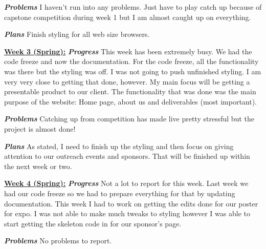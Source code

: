 \documentclass[onecolumn, draftclsnofoot, 10pt, compsoc]{IEEEtran}
\begin{document}
\textbf{\textit{{Problems}}}
\newline I haven't run into any problems. Just have to play catch up because of capstone competition during week 1 but I am almost caught up on everything. \newline 

\textbf{\textit{{Plans}}}
\newline Finish styling for all web size browsers. \newline 

\underline{\textbf{Week 3 (Spring):}}
\newline\textbf{\textit{{Progress}}}
\newline This week has been extremely busy. We had the code freeze and now the documentation. For the code freeze, all the functionality was there but the styling was off. I was not going to push unfinished styling. I am very very close to getting that done, however. My main focus will be getting a presentable product to our client. The functionality that was done was the main purpose of the website: Home page, about us and deliverables (most important). \newline 

\textbf{\textit{{Problems}}}
\newline Catching up from competition has made live pretty stressful but the project is almost done! \newline 

\textbf{\textit{{Plans}}}
\newline As stated, I need to finish up the styling and then focus on giving attention to our outreach events and sponsors. That will be finished up within the next week or two. \newline 

\underline{\textbf{Week 4 (Spring):}}
\newline\textbf{\textit{{Progress}}}
\newline Not a lot to report for this week. Last week we had our code freeze so we had to prepare everything for that by updating documentation. This week I had to work on getting the edits done for our poster for expo. I was not able to make much tweaks to styling however I was able to start getting the skeleton code in for our sponsor's page.  \newline 

\textbf{\textit{{Problems}}}
\newline No problems to report. \newline  
\end{document}
